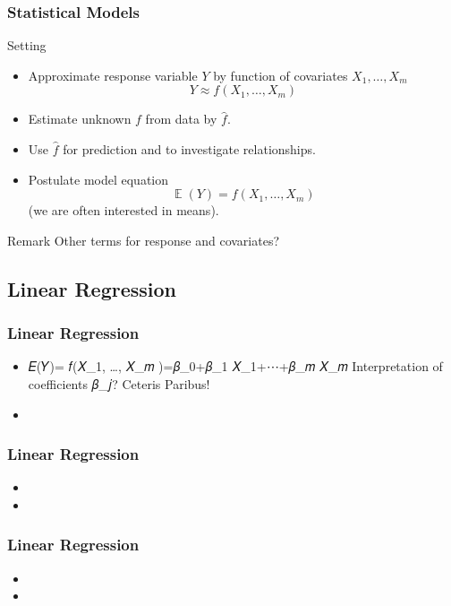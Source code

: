 \documentclass[
    utf8,
    aspectratio=169
]{beamer}  %
\DeclareMathOperator{\E}{\mathbb{E}}  %
\begin{document}
\begin{frame}
\frametitle{Statistical Models}
\begin{block}{Setting}
	\begin{itemize}
		\item Approximate \alert{response variable} $Y$ by function of \alert{covariates} $X_1,\dots,X_m$
		$$
			Y \approx f(X_1,\dots,X_m)
		$$
		\item Estimate unknown $f$ from data by $\hat f$.
		\item Use $\hat f$ for prediction and to investigate relationships.
		\item Postulate model equation
		$$
			\E(Y) = f(X_1, \dots, X_m)
		$$
		(we are often interested in means).
		\end{itemize}
	\end{block}
	
	\begin{block}{Remark}
	Other terms for response and covariates?
	\end{block}
\end{frame}

\subsection{Linear Regression}

\begin{frame}
\frametitle{Linear Regression}
\begin{itemize}
	\item 𝐸(𝑌)= 𝑓(𝑋_1, …, 𝑋_𝑚 )=𝛽_0+𝛽_1 𝑋_1+⋯+𝛽_𝑚 𝑋_𝑚
	Interpretation of coefficients 𝛽_𝑗? Ceteris Paribus!
	
	\item
\end{itemize}
\end{frame}

\begin{frame}
\frametitle{Linear Regression}
\begin{itemize}
	\item 
	\item
\end{itemize}
\end{frame}

\begin{frame}
\frametitle{Linear Regression}
\begin{itemize}
	\item 
	\item
\end{itemize}
\end{frame}
\end{document}
